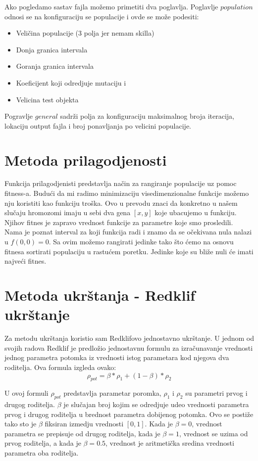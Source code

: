 \documentclass[a4paper,11pt]{book}
\begin{document}
Ako pogledamo sastav fajla možemo primetiti dva poglavlja. Poglavlje $population$ odnosi se na konfiguraciju se populacije i ovde se može podesiti:

\begin{itemize}
  \item Veličina populacije (3 polja jer nemam skilla)
  \item Donja granica intervala
  \item Goranja granica intervala
  \item Koeficijent koji odredjuje mutaciju i 
  \item Velicina test objekta
\end{itemize}
 
Pogravlje $general$ sadrži polja za konfiguraciju maksimalnog broja iteracija, lokaciju output fajla i broj ponavljanja po velicini populacije.

\section{Metoda prilagodjenosti}

Funkcija prilagodjenisti predstavlja način za rangiranje populacije uz pomoc fitness-a. Budući da mi radimo minimizaciju visedimenzionalne funkcije možemo nju koristiti kao funkciju troška. Ovo u prevodu znaci da konkretno u našem slučaju hromozomi imaju u sebi dva gena $[x,y]$ koje ubacujemo u funkciju. Njihov fitnes je zapravo vrednost funkcije za parametre koje smo prosledili.\\

Nama je poznat interval za koji funkcija radi i znamo da se očekivana nula nalazi u $f(0,0)=0$. Sa ovim možemo rangirati jedinke tako što ćemo na osnovu fitnesa sortirati populaciju u rastućem poretku. Jedinke koje su bliže nuli će imati najveći fitnes.

\section{Metoda ukrštanja - Redklif ukrštanje}

Za metodu ukrštanja koristio sam Redklifovo jednostavno ukrštanje. U jednom od svojih radova Redklif je predložio jednostavnu formulu za izračunavanje vrednosti jednog parametra potomka iz vrednosti istog parametara kod njegova dva roditelja. Ova formula izgleda ovako:
\[\rho_{pot} = \beta * \rho_{1} + (1-\beta) * \rho_{2}\]

U ovoj formuli $\rho_{pot}$ predstavlja parametar poromka, $\rho_{1}$ i $\rho_{2}$ su parametri prvog i drugog roditelja. $\beta$ je slučajan broj kojim se odredjuje udeo vrednosti parametra prvog i drugog roditelja u brednost parametra dobijenog potomka. Ovo se postiže tako sto je $\beta$ fiksiran izmedju vrednosti $[0,1]$. Kada je $\beta=0$, vrednost parametra se prepisuje od drugog roditelja, kada je $\beta=1$, vrednost se uzima od prvog roditelja, a kada je $\beta=0.5$, vrednost je aritmetička sredina vrednosti parametra oba roditelja.
\end{document}
